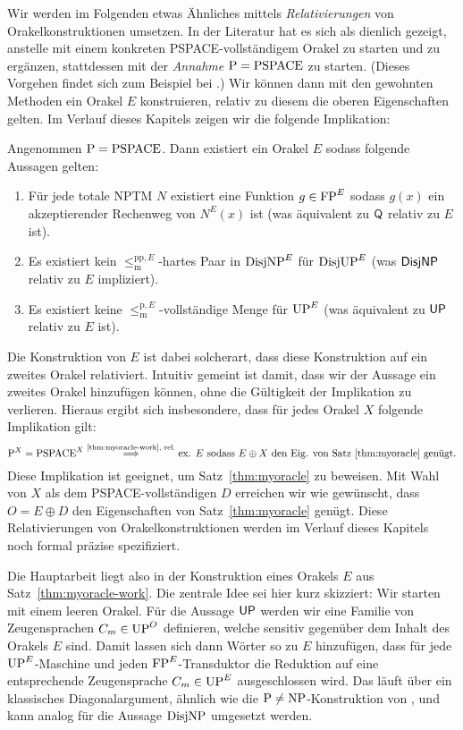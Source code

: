 Wir werden im Folgenden etwas Ähnliches mittels \emph{Relativierungen} von Orakelkonstruktionen umsetzen.
In der Literatur hat es sich als dienlich gezeigt, anstelle mit einem konkreten PSPACE-vollständigem Orakel zu starten und zu ergänzen, stattdessen mit der \emph{Annahme} $\P=\mathrm{PSPACE}$ zu starten. (Dieses Vorgehen findet sich zum Beispiel bei \pagebreak \cites{blum_generic_1987}{fortnow_separability_2002}{fenner_oracle_2003}.) 
Wir können dann mit den gewohnten Methoden ein Orakel $E$ konstruieren, relativ zu diesem die oberen Eigenschaften gelten. Im Verlauf dieses Kapitels zeigen wir die folgende Implikation:
\begin{theorem}\label{thm:myoracle-work}
    Angenommen $\P=\mathrm{PSPACE}$. Dann existiert ein Orakel $E$ sodass folgende Aussagen gelten:
    \begin{enumerate}
        \item Für jede totale NPTM $N$ existiert eine Funktion $g\in\FP^E$ sodass $g(x)$ ein akzeptierender Rechenweg von $N^E(x)$ ist (was äquivalent zu $\hQ$ relativ zu $E$ ist).
        \item Es existiert kein $\leq_\mathrm{m}^{\mathrm{pp},E}$-hartes Paar in $\DisjNP^E$ für $\DisjUP^E$ (was $\hDisjNP$ relativ zu $E$ impliziert).
        \item Es existiert keine $\leq_\mathrm{m}^{\mathrm{p},E}$-vollständige Menge für $\UP^E$ (was äquivalent zu $\hUP$ relativ zu $E$ ist).
    \end{enumerate}
\end{theorem}
Die Konstruktion von $E$ ist dabei solcherart, dass diese Konstruktion auf ein zweites Orakel relativiert. 
Intuitiv gemeint ist damit, dass wir der Aussage ein zweites Orakel hinzufügen können, ohne die Gültigkeit der Implikation zu verlieren. Hieraus ergibt sich insbesondere, dass für jedes Orakel $X$ folgende Implikation gilt:
\[ \P^X=\mathrm{PSPACE}^X \stackrel{\text{\ref{thm:myoracle-work}, rel.}}{\implies} \text{ex. $E$ sodass $E\oplus X$ den Eig. von Satz~\ref{thm:myoracle} genügt.} \]
Diese Implikation ist geeignet, um Satz~\ref{thm:myoracle} zu beweisen.
Mit Wahl von $X$ als dem PSPACE-vollständigen $D$ erreichen wir wie gewünscht, dass $O=E\oplus D$ den Eigenschaften von Satz~\ref{thm:myoracle} genügt.
Diese Relativierungen von Orakelkonstruktionen werden im Verlauf dieses Kapitels noch formal präzise spezifiziert.


Die Hauptarbeit liegt also in der Konstruktion eines Orakels $E$ aus Satz~\ref{thm:myoracle-work}.
Die zentrale Idee sei hier kurz skizziert:
Wir starten mit einem leeren Orakel.
Für die Aussage $\hUP$ werden wir eine Familie von Zeugensprachen $C_m\in\UP^O$ definieren, welche sensitiv gegenüber dem Inhalt des Orakels $E$ sind.
Damit lassen sich dann Wörter so zu $E$ hinzufügen, dass für jede $\UP^E$-Maschine und jeden $\FP^E$-Transduktor die Reduktion auf eine entsprechende Zeugensprache $C_m\in\UP^E$ ausgeschlossen wird.
Das läuft über ein klassisches Diagonalargument, ähnlich wie die $\P\neq\NP$-Konstruktion von \textcite{baker_relativizations_1975}, und kann analog für die Aussage $\DisjNP$ umgesetzt werden.

